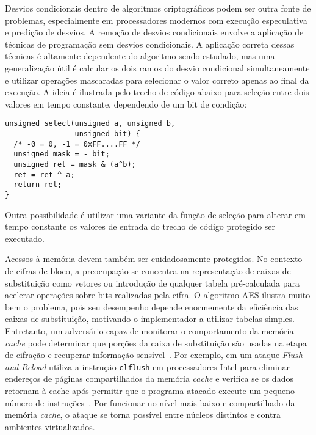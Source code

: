 Desvios condicionais dentro de algoritmos criptográficos podem ser outra fonte de problemas, 
especialmente em processadores modernos com execução especulativa e predição de desvios.
A remoção de desvios condicionais envolve a aplicação de técnicas de programação sem desvios condicionais.
A aplicação correta dessas técnicas é altamente dependente do algoritmo sendo estudado, mas uma
generalização útil é calcular os dois ramos do desvio condicional simultaneamente e utilizar
operações mascaradas para selecionar o valor correto apenas ao final da execução. A ideia é ilustrada pelo
trecho de código abaixo para seleção entre dois valores em tempo constante, dependendo de um bit de condição:
\begin{center}
\begin{verbatim}
unsigned select(unsigned a, unsigned b,
                unsigned bit) {
  /* -0 = 0, -1 = 0xFF....FF */
  unsigned mask = - bit;
  unsigned ret = mask & (a^b);
  ret = ret ^ a;
  return ret;
}
\end{verbatim}
\end{center}
Outra possibilidade é utilizar uma variante da função de seleção para alterar em tempo constante os valores de entrada do trecho de código
protegido ser executado.

Acessos à memória devem também ser cuidadosamente protegidos. No contexto de cifras de bloco, a preocupação
se concentra na representação de caixas de substituição como vetores ou introdução de qualquer tabela
pré-calculada para acelerar operações sobre bits realizadas pela cifra. O algoritmo AES ilustra muito bem o problema,
pois seu desempenho depende enormemente da eficiência das caixas de substituição, motivando o implementador
a utilizar tabelas simples. Entretanto, um adversário capaz de monitorar o comportamento da memória \emph{cache}
pode determinar que porções da caixa de substituição são usadas na etapa de cifração e recuperar
informação sensível~\cite{Bernstein04, Percival05, Bonneau06, TromerOS10}.
Por exemplo, em um ataque \emph{Flush and Reload} utiliza a instrução \texttt{clflush} em processadores Intel
para eliminar endereços de páginas compartilhados da memória \emph{cache} e verifica se os dados retornam à cache
após permitir que o programa atacado execute um pequeno número de instruções~\cite{YaromF14}. Por funcionar no nível
mais baixo e compartilhado da memória \emph{cache}, o ataque se torna possível entre núcleos distintos e contra ambientes virtualizados.

